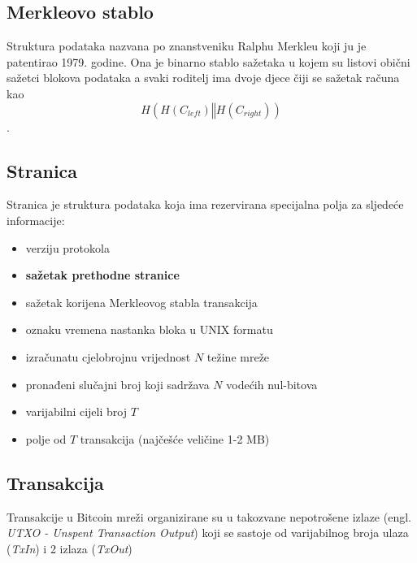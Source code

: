 \documentclass[utf8, zavrsni]{fer}
\begin{document}
\subsection{Merkleovo stablo}
Struktura podataka nazvana po znanstveniku Ralphu Merkleu koji ju je patentirao 1979. godine. Ona je binarno stablo sažetaka u kojem su listovi obični sažetci blokova podataka a svaki roditelj ima dvoje djece čiji se sažetak računa kao $$ H(H(C_{left}) \mathbin\Vert H(C_{right})) $$.
\subsection{Stranica}
Stranica je struktura podataka koja ima rezervirana specijalna polja za sljedeće informacije:
\begin{itemize}
    \item verziju protokola
    \item \textbf{sažetak prethodne stranice}
    \item sažetak korijena Merkleovog stabla transakcija
    \item oznaku vremena nastanka bloka u UNIX formatu
    \item izračunatu cjelobrojnu vrijednost $ N $ težine mreže
    \item pronađeni slučajni broj koji sadržava $ N $ vodećih nul-bitova
    \item varijabilni cijeli broj $ T $
    \item polje od $ T $ transakcija (najčešće veličine 1-2 MB)
\end{itemize}

\subsection{Transakcija}
Transakcije u Bitcoin mreži organizirane su u takozvane nepotrošene izlaze (engl. \textit{UTXO - Unspent Transaction Output}) koji se sastoje od varijabilnog broja ulaza (\textit{TxIn}) i 2 izlaza (\textit{TxOut})

\end{document}
